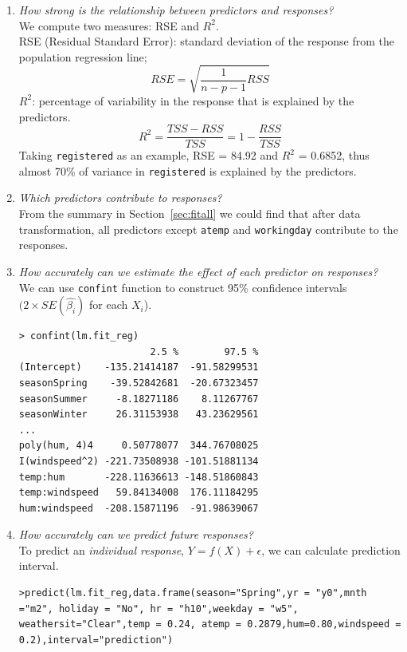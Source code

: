 \begin{enumerate}
  \item \textit{How strong is the relationship between predictors and responses?}\\
      We compute two measures: RSE and $R^2$.\\
       RSE (Residual Standard Error): standard deviation of the response from the population regression line;
       \begin{equation}\label{equ:rse}
         RSE = \sqrt{\frac{1}{n-p-1}RSS}
       \end{equation}
        $R^2$: percentage of variability in the response that is explained by the predictors.
        \begin{equation}\label{equ:rsq}
        R^2 = \frac{TSS-RSS}{TSS} = 1-\frac{RSS}{TSS}
       \end{equation}
       Taking \texttt{registered} as an example, RSE = 84.92 and $R^2$ = 0.6852, thus almost 70\% of variance in \texttt{registered} is explained by the predictors.
  \item \textit{Which predictors contribute to responses?}\\
      From the summary  in Section~\ref{sec:fitall} we could find that after data transformation, all predictors except \texttt{atemp} and \texttt{workingday} contribute to the responses.
  \item \textit{ How accurately can we estimate the effect of each predictor on responses?}\\
      We can use \texttt{confint} function to construct 95\% confidence intervals $(2 \times SE(\hat{\beta_i})$ for each $X_i$).
      \begin{lstlisting}[style=rlanguage]
> confint(lm.fit_reg)
                       2.5 %        97.5 %
(Intercept)    -135.21414187  -91.58299531
seasonSpring    -39.52842681  -20.67323457
seasonSummer     -8.18271186    8.11267767
seasonWinter     26.31153938   43.23629561
...
poly(hum, 4)4     0.50778077  344.76708025
I(windspeed^2) -221.73508938 -101.51881134
temp:hum       -228.11636613 -148.51860843
temp:windspeed   59.84134008  176.11184295
hum:windspeed  -208.15871196  -91.98639067
\end{lstlisting}
  \item \textit{How accurately can we predict future responses?}\\
      To predict an \emph{individual response}, $Y = f(X) + \epsilon$, we can calculate prediction interval.
\begin{lstlisting}[style = rlanguage]
>predict(lm.fit_reg,data.frame(season="Spring",yr = "y0",mnth ="m2", holiday = "No", hr = "h10",weekday = "w5", weathersit="Clear",temp = 0.24, atemp = 0.2879,hum=0.80,windspeed = 0.2),interval="prediction")

\end{lstlisting}
\end{enumerate}
